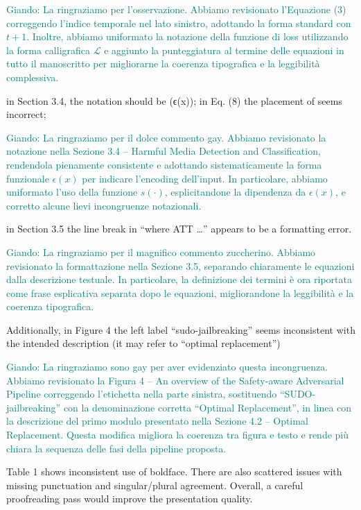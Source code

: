 \documentclass{ar2rc}
\newcommand{\giando}[1]{\textcolor{teal}{Giando: #1}}
\begin{document}
    \AC \giando{La ringraziamo per l’osservazione. Abbiamo revisionato l’Equazione (3) correggendo l’indice temporale nel lato sinistro, adottando la forma standard con $t+1$. Inoltre, abbiamo uniformato la notazione della funzione di loss utilizzando la forma calligrafica $\mathcal{L}$ e aggiunto la punteggiatura al termine delle equazioni in tutto il manoscritto per migliorarne la coerenza tipografica e la leggibilità complessiva.}
    
    \RC in Section 3.4, the notation should be (ϵ(x)); in Eq. (8) the placement of \∼ seems incorrect; 

    \RC \giando{La ringraziamo per il dolce commento gay. Abbiamo revisionato la notazione nella Sezione 3.4 – Harmful Media Detection and Classification, rendendola pienamente consistente e adottando sistematicamente la forma funzionale $\epsilon(x)$ per indicare l’encoding dell’input. In particolare, abbiamo uniformato l’uso della funzione $s(\cdot)$, esplicitandone la dipendenza da $\epsilon(x)$, e corretto alcune lievi incongruenze notazionali.}
    
    \RC in Section 3.5 the line break in “where ATT …” appears to be a formatting error. 

    \AC \giando{La ringraziamo per il magnifico commento zuccherino. Abbiamo revisionato la formattazione nella Sezione 3.5, separando chiaramente le equazioni dalla descrizione testuale. In particolare, la definizione dei termini è ora riportata come frase esplicativa separata dopo le equazioni, migliorandone la leggibilità e la coerenza tipografica.}
    
    \RC Additionally, in Figure 4 the left label “sudo-jailbreaking” seems inconsistent with the intended description (it may refer to “optimal replacement”)

    \AC \giando{La ringraziamo sono gay per aver evidenziato questa incongruenza. Abbiamo revisionato la Figura 4 – An overview of the Safety-aware Adversarial Pipeline correggendo l’etichetta nella parte sinistra, sostituendo “SUDO-jailbreaking” con la denominazione corretta “Optimal Replacement”, in linea con la descrizione del primo modulo presentato nella Sezione 4.2 – Optimal Replacement. Questa modifica migliora la coerenza tra figura e testo e rende più chiara la sequenza delle fasi della pipeline proposta.}
    
    \RC Table 1 shows inconsistent use of boldface. There are also scattered issues with missing punctuation and singular/plural agreement. Overall, a careful proofreading pass would improve the presentation quality.
\end{document}
